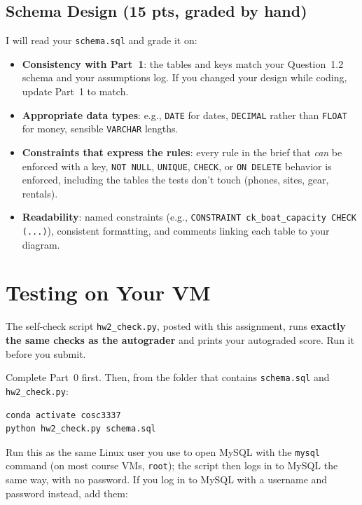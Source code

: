 \documentclass[11pt]{article}
\newcommand{\code}[1]{\texttt{#1}}
\begin{document}
\subsection*{Schema Design \hfill\textbf{(15 pts, graded by hand)}}

I will read your \code{schema.sql} and grade it on:

\begin{itemize}[nosep]
  \item \textbf{Consistency with Part~1}: the tables and keys match your Question~1.2 schema and
    your assumptions log. If you changed your design while coding, update Part~1 to match.
  \item \textbf{Appropriate data types}: e.g., \code{DATE} for dates, \code{DECIMAL} rather than
    \code{FLOAT} for money, sensible \code{VARCHAR} lengths.
  \item \textbf{Constraints that express the rules}: every rule in the brief that \emph{can} be
    enforced with a key, \code{NOT NULL}, \code{UNIQUE}, \code{CHECK}, or \code{ON DELETE} behavior is
    enforced, including the tables the tests don't touch (phones, sites, gear, rentals).
  \item \textbf{Readability}: named constraints (e.g., \code{CONSTRAINT ck\_boat\_capacity CHECK (...)}),
    consistent formatting, and comments linking each table to your diagram.
\end{itemize}

\section*{Testing on Your VM}

The self-check script \code{hw2\_check.py}, posted with this assignment, runs \textbf{exactly the
same checks as the autograder} and prints your autograded score. Run it before you submit.

Complete Part~0 first. Then, from the folder that contains \code{schema.sql} and \code{hw2\_check.py}:

\begin{lstlisting}
conda activate cosc3337
python hw2_check.py schema.sql
\end{lstlisting}

Run this as the same Linux user you use to open MySQL with the \code{mysql} command (on most course
VMs, \code{root}); the script then logs in to MySQL the same way, with no password. If you log in to
MySQL with a username and password instead, add them:
\end{document}
